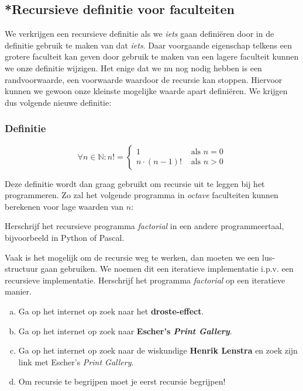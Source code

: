 \documentclass[12pt,a4paper,twoside]{article}
\begin{document}
\subsection{*Recursieve definitie voor faculteiten}

We verkrijgen een recursieve definitie als we {\em iets} gaan definiëren door in de definitie gebruik te maken van dat {\em iets}. Daar voorgaande eigenschap telkens een grotere faculteit kan geven door gebruik te maken van een lagere faculteit kunnen we onze definitie wijzigen. Het enige dat we nu nog nodig hebben is een randvoorwaarde, een voorwaarde waardoor de recursie kan stoppen. Hiervoor kunnen we gewoon onze kleinste mogelijke waarde apart definiëren. We krijgen dus volgende nieuwe definitie:

\subsubsection*{Definitie}
\begin{mdframed}
  \[\forall n \in \mathbb{N} : n!=
    \begin{cases}
      1        &\mbox{ als } n=0\\
      n \cdot (n-1)! &\mbox{ als } n>0
    \end{cases}
  \]
\end{mdframed}

Deze definitie wordt dan graag gebruikt om recursie uit te leggen bij het programmeren. Zo zal het volgende programma in {\em octave} faculteiten kunnen berekenen voor lage waarden van $n$:



\begin{oefening}
Herschrijf het recursieve programma {\em factorial} in een andere programmeertaal, bijvoorbeeld in Python of Pascal.
\end{oefening}

\begin{oefening}
Vaak is het mogelijk om de recursie weg te werken, dan moeten we een lus-structuur gaan gebruiken. We noemen dit een iteratieve implementatie i.p.v. een recursieve implementatie. Herschrijf het programma {\em factorial} op een iteratieve manier.
\end{oefening}

\begin{oefening}
\begin{enumerate}[(a)]
\item Ga op het internet op zoek naar het {\bf droste-effect}.
\item Ga op het internet op zoek naar {\bf Escher's {\em Print Gallery}}.
\item Ga op het internet op zoek naar de wiskundige {\bf Henrik Lenstra} en zoek zijn link met Escher's {\em Print Gallery}.
\item Om recursie te begrijpen moet je eerst recursie begrijpen!
\end{enumerate}
\end{oefening}
\end{document}

